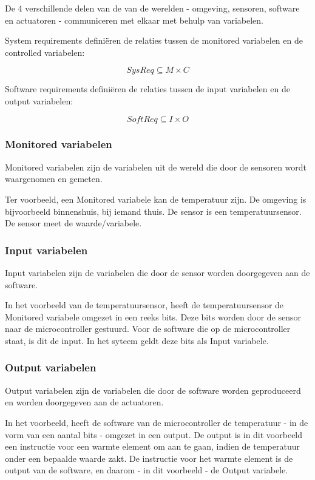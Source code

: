 \documentclass{article}
\begin{document}
		De 4 verschillende delen van de van de werelden - omgeving, sensoren, software en actuatoren - communiceren met elkaar met behulp van variabelen.
	
		System requirements definiëren de relaties tussen de monitored variabelen en de controlled variabelen:

		\[ SysReq \subseteq M \times C\]

		Software requirements definiëren de relaties tussen de input variabelen en de output variabelen:


		\[ SoftReq \subseteq I \times O \]
		
			\subsubsection{Monitored variabelen}
			
			Monitored variabelen zijn de variabelen uit de wereld die door de sensoren wordt waargenomen en gemeten.
			
			Ter voorbeeld, een Monitored variabele kan de temperatuur zijn. De omgeving is bijvoorbeeld binnenshuis, bij iemand thuis. De sensor is een temperatuursensor. De sensor meet de waarde/variabele.
			
			\subsubsection{Input variabelen}
			
			Input variabelen zijn de variabelen die door de sensor worden doorgegeven aan de software.

			In het voorbeeld van de temperatuursensor, heeft de temperatuursensor de Monitored variabele omgezet in een reeks bits. Deze bits worden door de sensor naar de microcontroller gestuurd. Voor de software die op de microcontroller staat, is dit de input. In het syteem geldt deze bits als Input variabele.
			
			\subsubsection{Output variabelen}
			
			Output variabelen zijn de variabelen die door de software worden geproduceerd en worden doorgegeven aan de actuatoren.

			In het voorbeeld, heeft de software van de microcontroller de temperatuur - in de vorm van een aantal bits - omgezet in een output. De output is in dit voorbeeld een instructie voor een warmte element om aan te gaan, indien de temperatuur onder een bepaalde waarde zakt. De instructie voor het warmte element is de output van de software, en daarom - in dit voorbeeld - de Output variabele.
\end{document}
